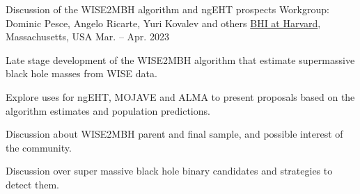 
\begin{cventries}

  \cventry
    {Discussion of the WISE2MBH algorithm and ngEHT prospects}
    {Workgroup: Dominic Pesce, Angelo Ricarte, Yuri Kovalev and others}
    {\href{https://bhi.fas.harvard.edu/}{BHI at Harvard}, Massachusetts, USA}
    {Mar. -- Apr. 2023}
    {
      \begin{cvitems}
        \item{Late stage development of the WISE2MBH algorithm that estimate supermassive black hole masses from WISE data.}
        \item{Explore uses for ngEHT, MOJAVE and ALMA to present proposals based on the algorithm estimates and population predictions.}
        \item {Discussion about WISE2MBH parent and final sample, and possible interest of the community.}
        \item{Discussion over super massive black hole binary candidates and strategies to detect them.}
      \end{cvitems}
    }
    

\end{cventries}

